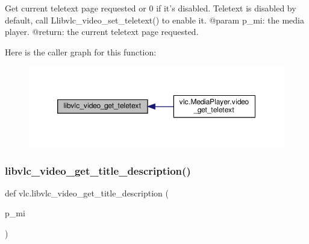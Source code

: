 \begin{DoxyVerb}Get current teletext page requested or 0 if it's disabled.
Teletext is disabled by default, call L{libvlc_video_set_teletext}() to enable
it.
@param p_mi: the media player.
@return: the current teletext page requested.
\end{DoxyVerb}
 Here is the caller graph for this function\+:
\nopagebreak
\begin{figure}[H]
\begin{center}
\leavevmode
\includegraphics[width=350pt]{namespacevlc_a5109017fbef0af0ea955b6aad723b1e3_icgraph}
\end{center}
\end{figure}
\mbox{\label{namespacevlc_aff9b7b91e260510010e50e5fdf038bc1}} 
\subsubsection{\texorpdfstring{libvlc\+\_\+video\+\_\+get\+\_\+title\+\_\+description()}{libvlc\_video\_get\_title\_description()}}
{\footnotesize\ttfamily def vlc.\+libvlc\+\_\+video\+\_\+get\+\_\+title\+\_\+description (\begin{DoxyParamCaption}\item[{}]{p\+\_\+mi }\end{DoxyParamCaption})}

